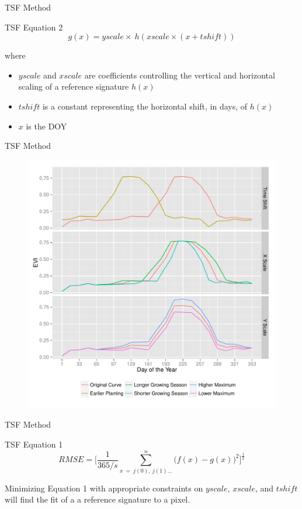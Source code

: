 \documentclass[draft,compress]{beamer}
\begin{document}
\begin{frame}{TSF Method}
\begin{block}{TSF Equation 2}
  \begin{equation*}
    g(x) = yscale\times~h\left(xscale\times(x + tshift)\right)
  \end{equation*}
\end{block}
\vspace{0.5\baselineskip}
where
\begin{itemize}
  \item $yscale$ and  $xscale$ are coefficients controlling the vertical and horizontal scaling of a reference signature $h(x)$
  \item $tshift$ is a constant representing the horizontal shift, in days, of $h(x)$
  \item $x$ is the DOY
\end{itemize}
\end{frame}

\begin{frame}{TSF Method}
\begin{figure}
  \centering
  \includegraphics[width=0.7\linewidth]{Graphics/transformations.pdf}
\end{figure}
\end{frame}

\begin{frame}{TSF Method}
\begin{block}{TSF Equation 1}
  \begin{equation*}
    RMSE = \biggl[\frac{1}{365/s}\sum_{x\ =\ j(0),\ j(1)\ldots}^{n}\bigl(f\left(x\right)-g\left(x\right)\bigr)^{2}\biggr]^{\frac{1}{2}}
  \end{equation*}
\end{block}
\vspace{0.5\baselineskip}
Minimizing Equation 1 with appropriate constraints on $yscale$, $xscale$, and $tshift$ will find the fit of a a reference signature to a pixel.
\end{frame}
\end{document}

